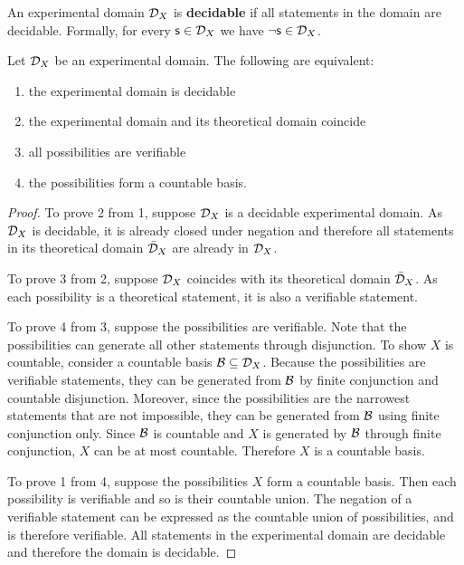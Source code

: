	\begin{mathSection}
		\begin{defn}
			An experimental domain $\mathcal{D}_X$ is \textbf{decidable} if all statements in the domain are decidable. Formally, for every $\mathsf{s} \in \mathcal{D}_X$ we have $\neg\mathsf{s} \in \mathcal{D}_X$.
		\end{defn}
		
		\begin{prop}\label{pm-vs-decidableDomainProperties}
			Let $\mathcal{D}_X$ be an experimental domain. The following are equivalent:
			\begin{enumerate}
				\item the experimental domain is decidable
				\item the experimental domain and its theoretical domain coincide
				\item all possibilities are verifiable
				\item the possibilities form a countable basis.
			\end{enumerate}
		\end{prop}
		
		\begin{proof}
			To prove 2 from 1, suppose $\mathcal{D}_X$ is a decidable experimental domain. As $\mathcal{D}_X$ is decidable, it is already closed under negation and therefore all statements in its theoretical domain $\bar{\mathcal{D}}_X$ are already in $\mathcal{D}_X$.
			
			To prove 3 from 2, suppose $\mathcal{D}_X$ coincides with its theoretical domain $\bar{\mathcal{D}}_X$. As each possibility is a theoretical statement, it is also a verifiable statement.
			
			To prove 4 from 3, suppose the possibilities are verifiable. Note that the possibilities can generate all other statements through disjunction. To show $X$ is countable, consider a countable basis $\mathcal{B} \subseteq \mathcal{D}_X$. Because the possibilities are verifiable statements, they can be generated from $\mathcal{B}$ by finite conjunction and countable disjunction. Moreover, since the possibilities are the narrowest statements that are not impossible, they can be generated from $\mathcal{B}$ using finite conjunction only. Since $\mathcal{B}$ is countable and $X$ is generated by $\mathcal{B}$ through finite conjunction, $X$ can be at most countable. Therefore $X$ is a countable basis.
			
			To prove 1 from 4, suppose the possibilities $X$ form a countable basis. Then each possibility is verifiable and so is their countable union. The negation of a verifiable statement can be expressed as the countable union of possibilities, and is therefore verifiable. All statements in the experimental domain are decidable and therefore the domain is decidable.
		\end{proof}
	\end{mathSection}
	
